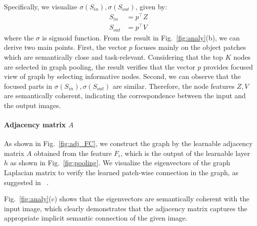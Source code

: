 \documentclass[letterpaper]{article} %
\begin{document}
Specifically, we visualize $\sigma(S_{in}), \sigma(S_{out})$, given by:
\begin{align}
	S_{in} &= p^\top Z \\
	S_{out} &= p^\top V
\end{align}
where the $\sigma$ is sigmoid function.
From the result in Fig.~\ref{fig:analy}(b), we can derive two main points.
First, the vector $p$ focuses mainly on the object patches which are semantically close and task-relevant.
Considering that the top $K$ nodes are selected in graph pooling, the result verifies that the vector $p$ provides focused view of graph by selecting informative nodes.
Second, we can observe that the focused parts in $\sigma(S_{in}), \sigma(S_{out})$ are similar. Therefore, the node features $Z, V$ are semantically coherent, indicating the correspondence between the input and the output images.




\paragraph{Adjacency matrix $A$}
As shown in Fig.~\ref{fig:adj_FC},
we construct the graph by the learnable adjacency matrix $A$ obtained from the feature $F_i$, which is the output of the learnable layer $h$ as shown in Fig.~\ref{fig:pooling}. We visualize the eigenvectors of the graph Laplacian matrix to verify the learned patch-wise connection in the graph, as suggested in ~\cite{deepSpectral}.

Fig.~\ref{fig:analy}(c) shows that the eigenvectors are semantically coherent with the input image, which clearly demonstrates that the adjacency matrix captures the appropriate implicit semantic connection of the given image.
\end{document}

